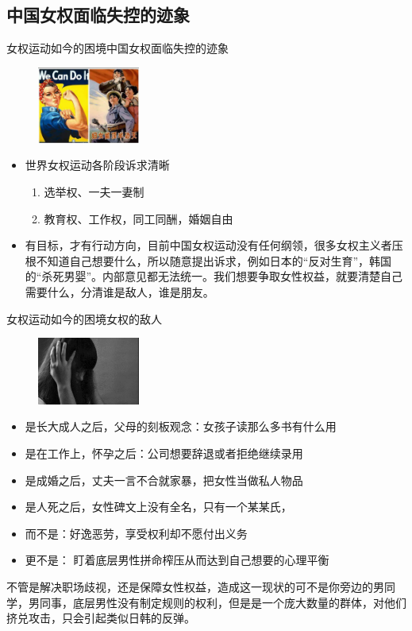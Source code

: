 \documentclass{beamer}
\begin{document}
	\subsection{中国女权面临失控的迹象}
	\begin{frame}{女权运动如今的困境}{中国女权面临失控的迹象}
		\begin{figure}
			\centering
			\includegraphics[width=0.3\textwidth]{img/图片10.png}
		\end{figure}
		\begin{itemize}
			\item 世界女权运动各阶段诉求清晰
			\begin{enumerate}
				\item 选举权、一夫一妻制
				\item 教育权、工作权，同工同酬，婚姻自由
			\end{enumerate}
			\item 有目标，才有行动方向，目前中国女权运动没有任何纲领，很多女权主义者压根不知道自己想要什么，所以随意提出诉求，例如日本的“反对生育”，韩国的“杀死男婴”。内部意见都无法统一。我们想要争取女性权益，就要清楚自己需要什么，分清谁是敌人，谁是朋友。
			
		\end{itemize}
	\end{frame}

	\begin{frame}{女权运动如今的困境}{女权的敌人}
		\begin{figure}
			\centering
			\includegraphics[width=0.3\textwidth]{img/图片11.png}
		\end{figure}
		\begin{itemize}
			\item 是长大成人之后，父母的刻板观念：女孩子读那么多书有什么用
			\item 是在工作上，怀孕之后：公司想要辞退或者拒绝继续录用
			\item 是成婚之后，丈夫一言不合就家暴，把女性当做私人物品
			\item 是人死之后，女性碑文上没有全名，只有一个某某氏，
			\item 而不是：好逸恶劳，享受权利却不愿付出义务
			\item 更不是： 盯着底层男性拼命榨压从而达到自己想要的心理平衡
		\end{itemize}

		不管是解决职场歧视，还是保障女性权益，造成这一现状的可不是你旁边的男同学，男同事，底层男性没有制定规则的权利，但是是一个庞大数量的群体，对他们挤兑攻击，只会引起类似日韩的反弹。
	\end{frame}
\end{document}
